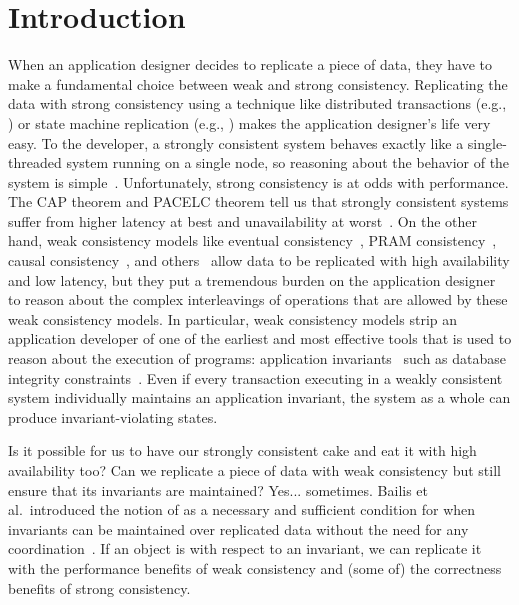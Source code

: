 \section{Introduction}
When an application designer decides to replicate a piece of data, they have to
make a fundamental choice between weak and strong consistency. Replicating the
data with strong consistency using a technique like distributed transactions
(e.g., \cite{bernstein1981concurrency,mohan1986transaction}) or state machine
replication (e.g., \cite{schneider1990implementing, lamport1998part,
liskov2012viewstamped, ongaro2014search}) makes the application designer's life
very easy. To the developer, a strongly consistent system behaves exactly like
a single-threaded system running on a single node, so reasoning about the
behavior of the system is simple~\cite{herlihy1990linearizability}.
Unfortunately, strong consistency is at odds with performance. The CAP theorem
and PACELC theorem tell us that strongly consistent systems suffer from higher
latency at best and unavailability at worst~\cite{gilbert2002brewer,
brewer2012cap, abadi2012consistency}. On the other hand, weak consistency
models like eventual consistency~\cite{vogels2009eventually}, PRAM
consistency~\cite{lipton1988pram}, causal consistency~\cite{ahamad1995causal},
and others~\cite{lloyd2011don, mehdi2017can} allow data to be replicated with
high availability and low latency, but they put a tremendous burden on the
application designer to reason about the complex interleavings of operations
that are allowed by these weak consistency models. In particular, weak
consistency models strip an application developer of one of the earliest and
most effective tools that is used to reason about the execution of programs:
application invariants~\cite{hoare1969axiomatic, balegas2015towards} such as
database integrity constraints~\cite{grefen1993integrity, gupta1993local}. Even
if every transaction executing in a weakly consistent system individually
maintains an application invariant, the system as a whole can produce
invariant-violating states.

Is it possible for us to have our strongly consistent cake and eat it with high
availability too? Can we replicate a piece of data with weak consistency but
still ensure that its invariants are maintained? Yes... sometimes. Bailis et
al.\ introduced the notion of \emph{\invariantconfluence{}} as a necessary and
sufficient condition for when invariants can be maintained over replicated data
without the need for any coordination~\cite{bailis2014coordination}. If an
object is \invariantconfluent{} with respect to an invariant, we can replicate
it with the performance benefits of weak consistency and (some of) the
correctness benefits of strong consistency.

